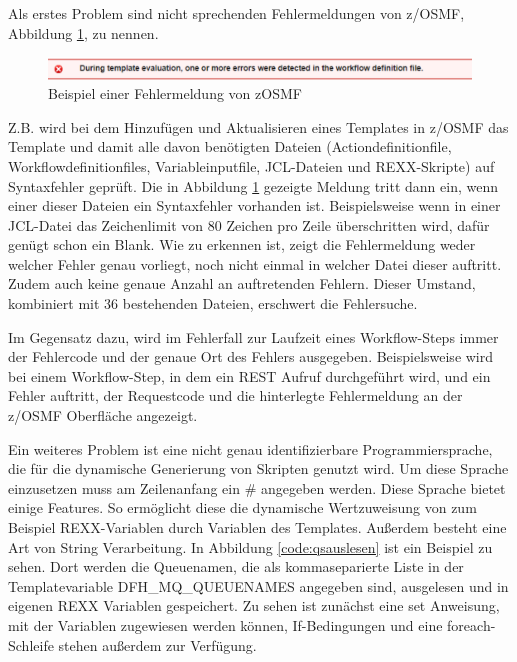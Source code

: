 Als erstes Problem sind nicht sprechenden Fehlermeldungen von z/OSMF, Abbildung \ref{fig:zosmffehler}, zu nennen.
\begin{figure}[h]
	\centering
	\includegraphics[width=\textwidth]{figures/zosmffehlermeldung.png}
	\caption{Beispiel einer Fehlermeldung von zOSMF}
	\label{fig:zosmffehler}
\end{figure}
Z.B. wird bei dem Hinzufügen und Aktualisieren eines Templates in z/OSMF das Template und damit alle davon benötigten Dateien (Actiondefinitionfile, Workflowdefinitionfiles, Variableinputfile, JCL-Dateien und REXX-Skripte) auf Syntaxfehler geprüft.
Die in Abbildung \ref{fig:zosmffehler} gezeigte Meldung tritt dann ein, wenn einer dieser Dateien ein Syntaxfehler vorhanden ist.
Beispielsweise wenn in einer JCL-Datei das Zeichenlimit von 80 Zeichen pro Zeile überschritten wird, dafür genügt schon ein \glqq Blank\grqq.
Wie zu erkennen ist, zeigt die Fehlermeldung weder welcher Fehler genau vorliegt, noch nicht einmal in welcher Datei dieser auftritt.
Zudem auch keine genaue Anzahl an auftretenden Fehlern.
Dieser Umstand, kombiniert mit 36 bestehenden Dateien, erschwert die Fehlersuche.

Im Gegensatz dazu, wird im Fehlerfall zur Laufzeit eines Workflow-Steps immer der Fehlercode und der genaue Ort des Fehlers ausgegeben.
Beispielsweise wird bei einem Workflow-Step, in dem ein REST Aufruf durchgeführt wird, und ein Fehler auftritt, der Requestcode und die hinterlegte Fehlermeldung an der z/OSMF Oberfläche angezeigt. 

Ein weiteres Problem ist eine nicht genau identifizierbare Programmiersprache, die für die dynamische Generierung von Skripten genutzt wird.
Um diese Sprache einzusetzen muss am Zeilenanfang ein \glqq\#\grqq{} angegeben werden.
Diese Sprache bietet einige Features.
So ermöglicht diese die dynamische Wertzuweisung von zum Beispiel REXX-Variablen durch Variablen des Templates.
Außerdem besteht eine Art von String Verarbeitung.
In Abbildung \ref{code:qsauslesen} ist ein Beispiel zu sehen.
Dort werden die Queuenamen, die als kommaseparierte Liste in der Templatevariable \glqq DFH\_MQ\_QUEUENAMES\grqq{} angegeben sind, ausgelesen und in eigenen REXX Variablen gespeichert.
Zu sehen ist zunächst eine \glqq set\grqq{} Anweisung, mit der Variablen zugewiesen werden können, If-Bedingungen und eine foreach-Schleife stehen außerdem zur Verfügung.

